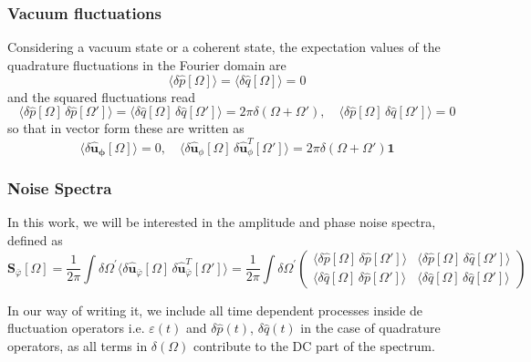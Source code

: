 \subsubsection{Vacuum fluctuations}
Considering a vacuum state or a coherent state, the expectation values of the quadrature fluctuations in the Fourier domain are
\begin{equation}
\langle \delta \hat{p}[\Omega] \rangle = \langle \delta \hat{q}[\Omega] \rangle = 0 
\end{equation}
and the squared fluctuations read
\begin{equation}
\langle \delta \hat{p}[\Omega] \, \delta \hat{p}[\Omega'] \rangle = \langle \delta \hat{q}[\Omega] \, \delta \hat{q}[\Omega'] \rangle = 2\pi  \delta(\Omega + \Omega'), \quad \langle \delta \hat{p}[\Omega] \, \delta \hat{q}[\Omega'] \rangle = 0
\end{equation}
so that in vector form these are written as
\begin{equation}
  \langle \delta \mathbf{\hat{u}_{\phi}}[\Omega] \rangle = 0, \quad
\langle \delta \mathbf{\hat{\mathbf u}}_{\phi}[\Omega] \, \delta \mathbf{\hat{\mathbf u}}_{\phi}^{T}[\Omega'] \rangle = 2\pi \delta(\Omega + \Omega') \mathbf{1}
\end{equation}
\subsubsection{Noise Spectra}
In this work, we will be interested in the amplitude and phase noise spectra, defined as
\begin{equation}
  \mathbf{S}_{\bar{\varphi}}[\Omega] =   \frac{1}{2\pi} \int \delta \Omega^{'} \langle \delta \mathbf{\hat{u}}_{\bar{\varphi}}[\Omega]\, \delta \mathbf{\hat{u}}_{\bar{\varphi}}^{T}[\Omega'] \rangle =  \frac{1}{2\pi} \int \delta \Omega^{'} \begin{pmatrix}
  \langle \delta \hat{p}[\Omega]\,\delta \hat{p}[\Omega'] \rangle & \langle \delta \hat{p}[\Omega]\,\delta \hat{q}[\Omega'] \rangle \\[4pt]
  \langle \delta \hat{q}[\Omega]\,\delta \hat{p}[\Omega'] \rangle & \langle \delta \hat{q}[\Omega]\,\delta \hat{q}[\Omega'] \rangle
  \end{pmatrix}
\label{eq:Sa}
\end{equation}

In our way of writing it, we include all time dependent processes inside de fluctuation operators i.e. $\varepsilon(t)$ and $\delta \hat{p}(t)$, $\delta \hat{q}(t)$ in the case of quadrature operators, as all terms in $\delta (\Omega)$ contribute to the DC part of the spectrum. \\

